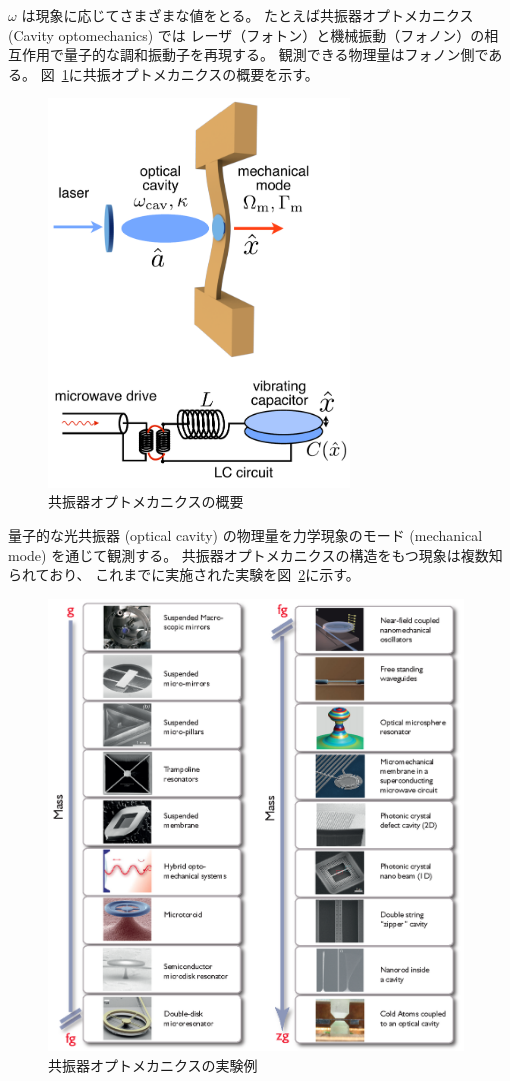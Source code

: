 $\omega$ は現象に応じてさまざまな値をとる。
たとえば共振器オプトメカニクス (Cavity optomechanics) では
レーザ（フォトン）と機械振動（フォノン）の相互作用で量子的な調和振動子を再現する。
観測できる物理量はフォノン側である。
図~\ref{fig:FigureOptomechanicalSystem}に共振オプトメカニクスの概要を示す。
\begin{figure}[tbp]
  \begin{center}
    \includegraphics[width=8cm]{img/FigureOptomechanicalSystem.pdf}
    \caption{共振器オプトメカニクスの概要~\cite{aspelmeyer2014cavity}}\label{fig:FigureOptomechanicalSystem}
  \end{center}
\end{figure}
量子的な光共振器 (optical cavity) の物理量を力学現象のモード (mechanical mode) を通じて観測する。
共振器オプトメカニクスの構造をもつ現象は複数知られており、
これまでに実施された実験を図~\ref{fig:Figure_Overview_OptomechanicsFinal}に示す。
\begin{figure}[tbp]
  \begin{center}
    \includegraphics[width=11cm]{img/Figure_Overview_OptomechanicsFinal.png}
    \caption{共振器オプトメカニクスの実験例}\label{fig:Figure_Overview_OptomechanicsFinal}
  \end{center}
\end{figure}
